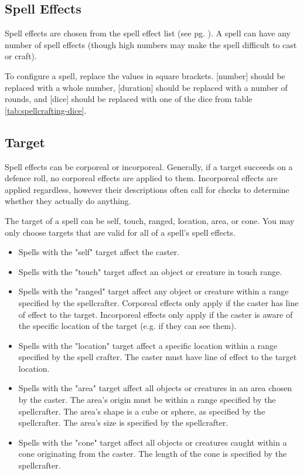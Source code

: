     \subsection{Spell Effects}
    Spell effects are chosen from the spell effect list (see pg.
    \pageref{spell-effect-list}). A spell can have any number of spell effects
    (though high numbers may make the spell difficult to cast or craft).

    To configure a spell, replace the values in square brackets. [number] should
    be replaced with a whole number, [duration] should be replaced with a number
    of rounds, and [dice] should be replaced with one of the dice from table
    \ref{tab:spellcrafting-dice}.


    \subsection{Target}
    Spell effects can be corporeal or incorporeal. Generally, if a target succeeds on a
    defence roll, no corporeal effects are applied to them. Incorporeal effects
    are applied regardless, however their descriptions often call for checks
    to determine whether they actually do anything.

    The target of a spell can be self, touch, ranged, location, area, or cone.
    You may only choose targets that are valid for all of a spell's spell
    effects.
    \begin{itemize}
        \item Spells with the "self" target affect the caster.
        \item Spells with the "touch" target affect an object or creature in
            touch range.
        \item Spells with the "ranged" target affect any object or creature
            within a range specified by the spellcrafter.
            Corporeal effects only apply if the caster has line of effect
            to the target. Incorporeal effects only apply if the caster is
            aware of the specific location of the target (e.g. if they can see
            them).
        \item Spells with the "location" target affect a specific location
            within a range specified by the spell crafter. The caster must have
            line of effect to the target location.
        \item Spells with the "area" target affect all objects or creatures
            in an area chosen by the caster. The area's origin must be within
            a range specified by the spellcrafter. The area's shape is a cube
            or sphere, as specified by the spellcrafter. The area's size is
            specified by the spellcrafter.
        \item Spells with the "cone" target affect all objects or creatures
            caught within a cone originating from the caster. The length of
            the cone is specified by the spellcrafter.
    \end{itemize}

